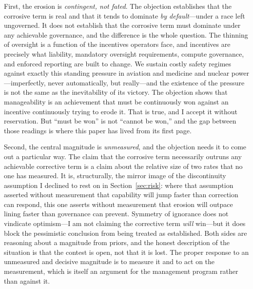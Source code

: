 \documentclass[11pt]{article}
\begin{document}
First, the erosion is \emph{contingent, not fated}. The objection establishes that the corrosive term is real and that it tends to dominate \emph{by default}---under a race left ungoverned. It does not establish that the corrosive term must dominate under any achievable governance, and the difference is the whole question. The thinning of oversight is a function of the incentives operators face, and incentives are precisely what liability, mandatory oversight requirements, compute governance, and enforced reporting are built to change. We sustain costly safety regimes against exactly this standing pressure in aviation and medicine and nuclear power---imperfectly, never automatically, but really---and the existence of the pressure is not the same as the inevitability of its victory. The objection shows that manageability is an achievement that must be continuously won against an incentive continuously trying to erode it. That is true, and I accept it without reservation. But ``must be won'' is not ``cannot be won,'' and the gap between those readings is where this paper has lived from its first page.

Second, the central magnitude is \emph{unmeasured}, and the objection needs it to come out a particular way. The claim that the corrosive term necessarily outruns any achievable corrective term is a claim about the relative size of two rates that no one has measured. It is, structurally, the mirror image of the discontinuity assumption I declined to rest on in Section~\ref{sec:risk}: where that assumption asserted without measurement that capability will jump faster than correction can respond, this one asserts without measurement that erosion will outpace lining faster than governance can prevent. Symmetry of ignorance does not vindicate optimism---I am not claiming the corrective term \emph{will} win---but it does block the pessimistic conclusion from being treated as established. Both sides are reasoning about a magnitude from priors, and the honest description of the situation is that the contest is open, not that it is lost. The proper response to an unmeasured and decisive magnitude is to measure it and to act on the measurement, which is itself an argument for the management program rather than against it.
\end{document}
